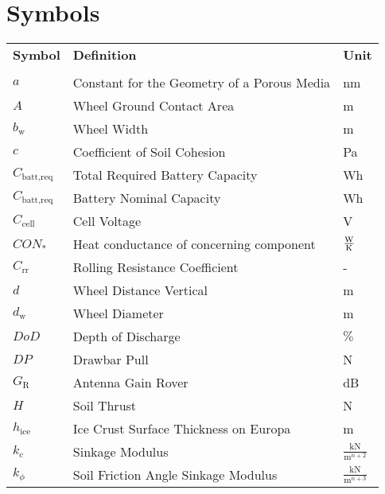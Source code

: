 \chapter*{Symbols}



\renewcommand{\arraystretch}{1.2}

\begin{longtable}[l]{lll}

	\textbf{Symbol}	&	\textbf{Definition}	\hspace{8cm}	&	\textbf{Unit}	\\ \\


\(a\)					&	Constant for the Geometry of a Porous Media	& nm							\\
\(A\)					&	Wheel Ground Contact Area					& m								\\
\(b_\text{w}\)			&	Wheel Width 								& m								\\
\(c\)					&	Coefficient of Soil Cohesion				& Pa							\\
$C_\text{batt,req}$		&	Total Required Battery Capacity				& Wh							\\
$C_\text{batt,req}$		&	Battery Nominal Capacity					& Wh							\\
$C_\text{cell}$			&	Cell Voltage								& V								\\
$CON_*$					&	Heat conductance of concerning component	& $\frac{{\rm W}}{{\rm K}}$				\\
\(C_\text{rr}\)			&	Rolling Resistance Coefficient					& -								\\	
\(d\)					&	Wheel Distance Vertical						& m								\\
\(d_\text{w}\)			&	Wheel Diameter								& m								\\
$DoD$					&	Depth of Discharge							& $\%$							\\
\(DP\)					&	Drawbar Pull								& N								\\
${G}_\text{R}$ 				&	Antenna 	Gain	 Rover							& dB							
\\ \(H\)				&	Soil Thrust									& N								\\
\(h_\text{ice}\)		&	Ice Crust Surface Thickness on Europa		&	m							\\
\(k_\text{c}\)			&	Sinkage Modulus								& \(\frac{\text{kN}}{\text{m}^{n+2}}\) \\
\(k_\phi\)				&	Soil Friction Angle Sinkage Modulus			& \(\frac{\text{kN}}{\text{m}^{n+3}}\) \\

\end{longtable}
